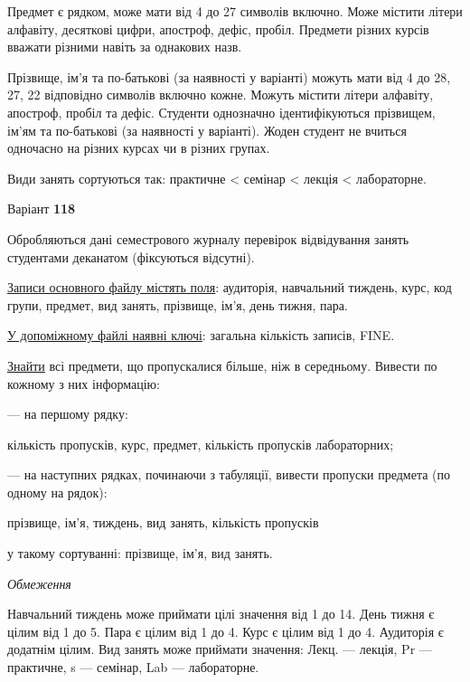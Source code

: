 \documentclass[11pt, ukrainian]{article}
\begin{document}
Предмет є рядком, може мати від 4 до 27 символів включно.
Може містити літери алфавіту, десяткові цифри, апостроф, дефіс, пробіл.
Предмети різних курсів вважати різними навіть за однакових назв.

Прізвище, ім’я та по-батькові (за наявності у варіанті)
можуть мати від 4 до 28, 27, 22 відповідно символів включно кожне.
Можуть містити літери алфавіту, апостроф, пробіл та дефіс.
Студенти однозначно ідентифікуються прізвищем, ім’ям та по-батькові (за наявності у варіанті).
Жоден студент не вчиться одночасно на різних курсах чи в різних групах.

Види занять сортуються так: практичне < семінар < лекція < лабораторне.





\par
\newpage
{\center Варіант  \No \textbf { 118 }\par}
\bigskip
Обробляються дані семестрового журналу перевірок відвідування занять студентами деканатом (фіксуються відсутні). 

\underline{Записи основного файлу містять поля}: аудиторія, навчальний тиждень, курс, код групи, предмет, вид занять, прізвище, ім’я, день тижня, пара.

\underline{У допоміжному файлі наявні ключі}: загальна кількість записів, FINE.

\underline{Знайти} всі предмети, що пропускалися більше, ніж в середньому. Вивести по кожному з них інформацію:\par
{\noindent}--- на першому рядку:\par
кількість пропусків, курс, предмет, кількість пропусків лабораторних;

{\noindent}--- на наступних рядках, починаючи з табуляції, вивести пропуски предмета (по одному на рядок):\par
прізвище, ім’я, тиждень, вид занять, кількість пропусків

{\noindent}у такому сортуванні: прізвище, ім’я, вид занять.


\bigskip\textit{Обмеження}

Навчальний тиждень може приймати цілі значення від 1 до 14.
День тижня є цілим від 1 до 5. Пара є цілим від 1 до 4.
Курс є цілим від 1 до 4. Аудиторія є додатнім цілим.
Вид занять може приймати значення:
Лекц. --- лекція, Pr --- практичне, s --- семінар, Lab --- лабораторне.
\end{document}
